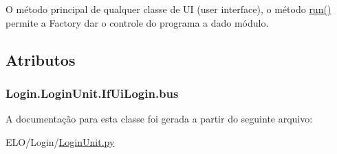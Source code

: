 O método principal de qualquer classe de U\-I (user interface), o método \hyperlink{classLogin_1_1LoginUnit_1_1IfUiLogin_ac6250c19afa63158907c6e8b4ff6dbd5}{run()} permite a Factory dar o controle do programa a dado módulo. 



\subsection{Atributos}
\hypertarget{classLogin_1_1LoginUnit_1_1IfUiLogin_af6823ae4c77d340c2341932d8f338753}{
\subsubsection[{bus}]{\setlength{\rightskip}{0pt plus 5cm}Login.\-Login\-Unit.\-If\-Ui\-Login.\-bus}}\label{d9/d56/classLogin_1_1LoginUnit_1_1IfUiLogin_af6823ae4c77d340c2341932d8f338753}


A documentação para esta classe foi gerada a partir do seguinte arquivo\-:\begin{DoxyCompactItemize}
\item 
E\-L\-O/\-Login/\hyperlink{LoginUnit_8py}{Login\-Unit.\-py}\end{DoxyCompactItemize}
